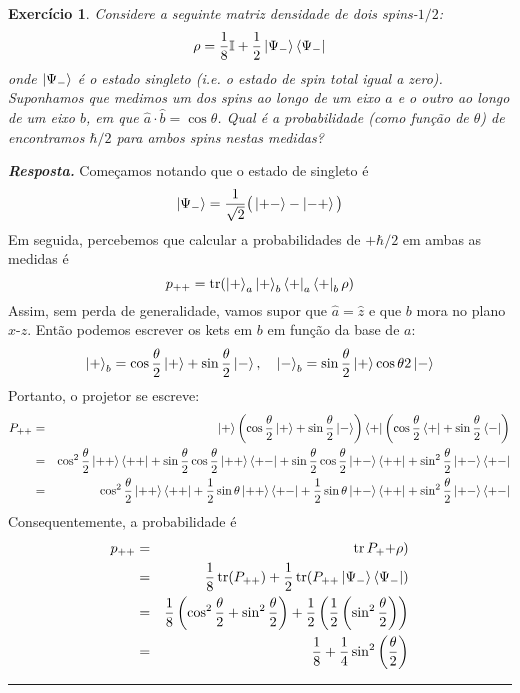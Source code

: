 \documentclass[12pt]{article}
\def\be{\begin{equation}}
\def\ee{\end{equation}}
\def\bea{\begin{eqnarray*}}
\def\eea{\end{eqnarray*}}
\def\f{\frac}
\def\l{\left}
\def\r{\right}
\newtheorem{exercise}{Exercício}
\newenvironment{answer}{\noindent\textbf{\textit{Resposta.}} \normalfont }{\par\noindent\rule{\textwidth}{0.4pt}}
\DeclareMathOperator{\tr}{tr}
\begin{document}
	
	\begin{exercise}
		Considere a seguinte matriz densidade de dois spins-$1/2$:
		\be
			\rho = \f{1}{8}\mathbb{I} + \f{1}{2} \ket{\Psi_-}\bra{\Psi_-}
 		\ee
		onde $\ket{\Psi_-}$ é o estado singleto (i.e. o estado de spin total igual a zero). Suponhamos que medimos um dos spins ao longo de um eixo $a$ e o outro ao longo de um eixo $b$, em que $\hat{a}\cdot\hat{b}=\cos\theta$. Qual é a probabilidade (como função de $\theta$) de encontramos $\hbar/2$ para ambos spins nestas medidas?
	\end{exercise}
	\begin{answer}
		Começamos notando que o estado de singleto é
		\be
			\ket{\Psi_-} = \f{1}{\sqrt{2}}\big( \ket{+-} - \ket{-+} \big)	
		\ee
		Em seguida, percebemos que calcular a probabilidades de $+\hbar/2$ em ambas as medidas é
		\be
			p_{++} = \tr( \ket{+}_a\ket{+}_b\bra{+}_a\bra{+}_b \rho)
		\ee
		Assim, sem perda de generalidade, vamos supor que $\hat{a}=\hat{z}$ e que $b$ mora no plano $x$-$z$. Então podemos escrever os kets em $b$ em função da base de $a$:
		\be
			\ket{+}_b = \cos\f{\theta}{2}\ket{+} + \sin\f{\theta}{2} \ket{-}, \quad \ket{-}_b = \sin\f{\theta}{2}\ket{+}  \cos{\theta}{2} \ket{-}
		\ee
		Portanto, o projetor se escreve:
		\bea
			P_{++} &=&  \ket{+}\l( \cos\f{\theta}{2}\ket{+} + \sin\f{\theta}{2} \ket{-}\r) \bra{+}\l(\cos\f{\theta}{2}\bra{+} + \sin\f{\theta}{2} \bra{-}\r) \\
				&=& \cos^2\f{\theta}{2}\ket{++}\bra{++} + \sin\f{\theta}{2}\cos\f{\theta}{2} \ket{++}\bra{+-} + \sin\f{\theta}{2}\cos\f{\theta}{2} \ket{+-}\bra{++} + \sin^2\f{\theta}{2} \ket{+-}\bra{+-} \\
				&=& \cos^2\f{\theta}{2}\ket{++}\bra{++} + \f{1}{2} \sin\theta \ket{++}\bra{+-} + \f{1}{2} \sin\theta\ket{+-}\bra{++} + \sin^2\f{\theta}{2} \ket{+-}\bra{+-}
		\eea
		Consequentemente, a probabilidade é
		\bea
			p_{++} &=& \tr{P_++}\rho) \\
				&=& \f{1}{8} \tr(P_{++}) + \f{1}{2} \tr(P_{++}\ket{\Psi_-}\bra{\Psi_-}) \\
				&=& \f{1}{8} \l( \cos^2\f{\theta}{2} + \sin^2\f{\theta}{2} \r) + \f{1}{2} \l( \f{1}{2} \l( \sin^2\f{\theta}{2} \r) \r) \\
				&=& \f{1}{8} + \f{1}{4}\sin^2\l(\f{\theta}{2}\r)
		\eea
		
		
	\end{answer}
	
\end{document}
